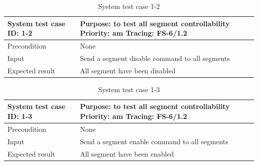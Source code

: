 \begin{table}[H]
	\caption{System test case 1-2}
	\label{table:TCase-FSS1-2}
	\begin{center}
		\renewcommand{\arraystretch}{1.8}
		\begin{tabu} 
			to 0.9 \textwidth
			{  X[0.3, l] X[l] }
			\toprule
			System test case ID: 1-2 & Purpose: to test all segment controllability \newline Priority: am \newline Tracing: FS-6/1.2 \\ \midrule
			Precondition             & None                                                                                          \\
			Input                    & Send a segment disable command to all segments                                                \\
			Expected result          & All segment have been disabled                                                                \\ \bottomrule
		\end{tabu}
	\end{center}
\end{table}

\begin{table}[H]
	\caption{System test case 1-3}
	\label{table:TCase-FSS1-3}
	\begin{center}
		\renewcommand{\arraystretch}{1.8}
		\begin{tabu} 
			to 0.9 \textwidth
			{  X[0.3, l] X[l] }
			\toprule
			System test case ID: 1-3 & Purpose: to test all segment controllability \newline Priority: am \newline Tracing: FS-6/1.2 \\ \midrule
			Precondition             & None                                                                                          \\
			Input                    & Send a segment enable command to all segments                                                 \\
			Expected result          & All segment have been enabled                                                                 \\ \bottomrule
		\end{tabu}
	\end{center}
\end{table}

